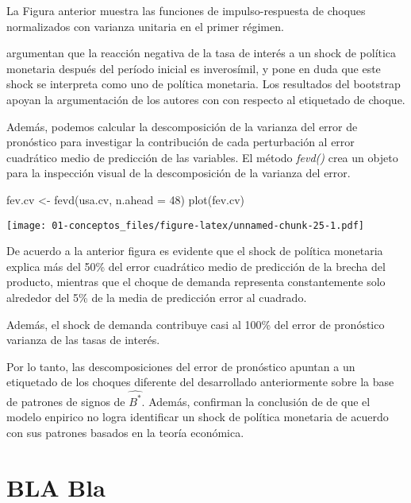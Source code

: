 \documentclass[
]{book}
\newenvironment{Shaded}{\begin{snugshade}}{\end{snugshade}}
\newcommand{\AttributeTok}[1]{\textcolor[rgb]{0.77,0.63,0.00}{#1}}
\newcommand{\DecValTok}[1]{\textcolor[rgb]{0.00,0.00,0.81}{#1}}
\newcommand{\FunctionTok}[1]{\textcolor[rgb]{0.00,0.00,0.00}{#1}}
\newcommand{\NormalTok}[1]{#1}
\newcommand{\OtherTok}[1]{\textcolor[rgb]{0.56,0.35,0.01}{#1}}
\begin{document}
La Figura anterior muestra las funciones de impulso-respuesta de choques normalizados con varianza unitaria en el primer régimen.

\citet{Herwartz2016} argumentan que la reacción negativa de la tasa de interés a un shock de política monetaria después del período inicial es inverosímil, y pone en duda que este shock se interpreta como uno de política monetaria. Los resultados del bootstrap apoyan la argumentación de los autores con
con respecto al etiquetado de choque.

Además, podemos calcular la descomposición de la varianza del error de pronóstico para investigar la contribución de cada perturbación al error cuadrático medio de predicción de las variables. El método \emph{fevd()}
crea un objeto para la inspección visual de la descomposición de la varianza del error.

\begin{Shaded}
\begin{Highlighting}[]
\NormalTok{fev.cv }\OtherTok{\textless{}{-}} \FunctionTok{fevd}\NormalTok{(usa.cv, }\AttributeTok{n.ahead =} \DecValTok{48}\NormalTok{)}
\FunctionTok{plot}\NormalTok{(fev.cv)}
\end{Highlighting}
\end{Shaded}

\texttt{[image: 01-conceptos\_files/figure-latex/unnamed-chunk-25-1.pdf]}

De acuerdo a la anterior figura es evidente que el shock de política monetaria explica más del 50\% del error cuadrático medio de predicción de la brecha del producto, mientras que el choque de demanda representa constantemente solo alrededor del 5\% de la media de predicción
error al cuadrado.

Además, el shock de demanda contribuye casi al 100\% del error de pronóstico
varianza de las tasas de interés.

Por lo tanto, las descomposiciones del error de pronóstico apuntan a un
etiquetado de los choques diferente del desarrollado anteriormente sobre la base de patrones de signos de \(\hat{B^{*}}\). Además, confirman la conclusión de \citet{Herwartz2016} de que el modelo enpirico no logra identificar un shock de política monetaria de acuerdo con sus patrones basados en la teoría económica.

\hypertarget{bla-bla}{%
\section{BLA Bla}\label{bla-bla}}
\end{document}
